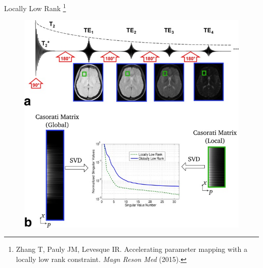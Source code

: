 \documentclass[aspectratio=169]{beamer}
\begin{document}
	\begin{frame}{Locally Low Rank \footnote{Zhang T, Pauly JM, Levesque IR. Accelerating parameter mapping with a locally low rank constraint. \textit{Magn Reson Med} (2015).}}
		\begin{figure}
			\centering
			\includegraphics[height=0.8\textheight]{figures/mrm25161-fig-0001-m.jpg}
		\end{figure}
	\end{frame}
	
\end{document}

